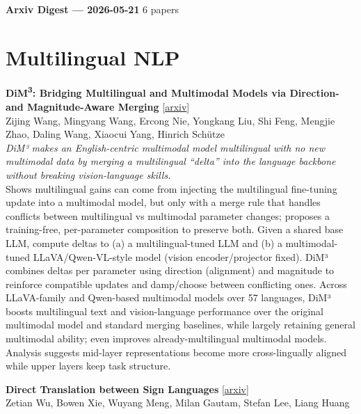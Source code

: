 \documentclass[12pt,letterpaper]{article}
\begin{document}
{\footnotesize\textbf{Arxiv Digest --- 2026-05-21} \hfill 6 papers}

\smallskip

\section*{Multilingual NLP}

{\small\textbf{DiM\textsuperscript{3}: Bridging Multilingual and Multimodal Models via Direction- and Magnitude-Aware Merging}} {\scriptsize[\href{https://arxiv.org/abs/2605.12960}{arxiv}]}\\
{\scriptsize Zijing Wang, Mingyang Wang, Ercong Nie, Yongkang Liu, Shi Feng, Mengjie Zhao, Daling Wang, Xiaocui Yang, Hinrich Sch\"utze}\\

{\small\textit{DiM³ makes an English-centric multimodal model multilingual with no new multimodal data by merging a multilingual ``delta'' into the language backbone without breaking vision-language skills.}}\\[1pt]
{\footnotesize Shows multilingual gains can come from injecting the multilingual fine-tuning update into a multimodal model, but only with a merge rule that handles conflicts between multilingual vs multimodal parameter changes; proposes a training-free, per-parameter composition to preserve both. Given a shared base LLM, compute deltas to (a) a multilingual-tuned LLM and (b) a multimodal-tuned LLaVA/Qwen-VL-style model (vision encoder/projector fixed). DiM³ combines deltas per parameter using direction (alignment) and magnitude to reinforce compatible updates and damp/choose between conflicting ones. Across LLaVA-family and Qwen-based multimodal models over 57 languages, DiM³ boosts multilingual text and vision-language performance over the original multimodal model and standard merging baselines, while largely retaining general multimodal ability; even improves already-multilingual multimodal models. Analysis suggests mid-layer representations become more cross-lingually aligned while upper layers keep task structure.}

\medskip

{\small\textbf{Direct Translation between Sign Languages}} {\scriptsize[\href{https://arxiv.org/abs/2605.20588}{arxiv}]}\\
{\scriptsize Zetian Wu, Bowen Xie, Wuyang Meng, Milan Gautam, Stefan Lee, Liang Huang}\\
\end{document}
